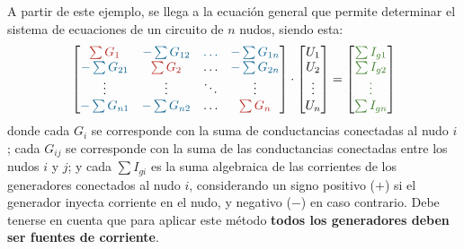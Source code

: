 	A partir de este ejemplo, se llega a la ecuación general que
        permite determinar el sistema de ecuaciones de un circuito de
        $n$ nudos, siendo esta:
	\begin{equation*}
          \begin{bmatrix}
            {\color{BrickRed}\sum G_{1}} &  {\color{MidnightBlue}-\sum G_{12}} & {\color{MidnightBlue}{\dots}} & {\color{MidnightBlue}-\sum G_{1n}} \\
            {\color{MidnightBlue}-\sum G_{21}} & {\color{BrickRed}\sum G_{2}} & {{\dots}} & {\color{MidnightBlue}-\sum G_{2n}} \\
            {\vdots} & {\vdots} &  {\ddots} & \vdots\\
            {\color{MidnightBlue}-\sum G_{n1}} & {\color{MidnightBlue}-\sum G_{n2}} & \dots & {\color{BrickRed}\sum G_{n}}
          \end{bmatrix} \cdot 
          \begin{bmatrix}
            U_1\\
            U_2\\
            \vdots\\
            U_n
          \end{bmatrix} = %
          \begin{bmatrix}
            {\color{OliveGreen}\sum I_{g1}}\\
            {\color{OliveGreen}\sum I_{g2}}\\
            {\color{OliveGreen}\vdots}\\
            {\color{OliveGreen}\sum I_{gn}}
          \end{bmatrix}
	\end{equation*}
	donde cada {\color{BrickRed}$G_{i}$} se corresponde con la suma
        de conductancias conectadas al nudo $i$; cada
        {\color{MidnightBlue}$ G_{ij}$} se corresponde con la suma de las
        conductancias conectadas entre los nudos $i$ y $j$; y cada
        {\color{OliveGreen} $\sum I_{gi}$} es la suma algebraica de las
        corrientes de los generadores conectados al nudo $i$,
        considerando un signo positivo ($+$) si el generador inyecta
        corriente en el nudo, y negativo ($-$) en caso contrario. Debe
        tenerse en cuenta que para aplicar este método \textbf{todos
          los generadores deben ser fuentes de corriente}.
	
